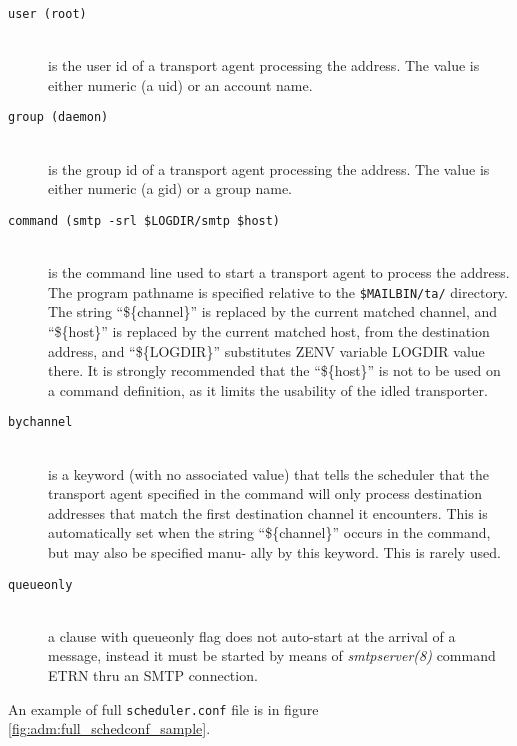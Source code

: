 \begin{description}
\item[\tt user \rm(root)]\mbox{}\\
is  the  user  id  of  a transport agent processing the
address.  The value is either numeric  (a  uid)  or  an
account name.

\item[\tt group \rm(daemon)]\mbox{}\\
is  the  group  id  of a transport agent processing the
address.  The value is either  numeric  (a  gid)  or a
group name.

\item[\tt command \rm(smtp -srl \$LOGDIR/smtp \$host)]\mbox{}\\
is  the command line used to start a transport agent to
process the address. The program pathname is specified
relative  to the  {\tt \$MAILBIN/ta/}  directory.   The  string
``\$\{channel\}'' is replaced by the current matched  channel,
and  ``\$\{host\}'' is  replaced by the current matched host,
from the destination address, and ``\$\{LOGDIR\}'' substitutes
ZENV variable LOGDIR value there.  It is strongly 
recommended that the ``\$\{host\}'' is not to be used on a command
definition, as it limits the usability of the idled transporter.

\item[\tt bychannel]\mbox{}\\
is a keyword (with no associated value) that tells  the
scheduler  that  the transport  agent specified in the
command will only process  destination  addresses  that
match  the  first  destination  channel  it encounters.
This is automatically set when  the  string  ``\$\{channel\}''
occurs  in the command, but may also be specified manu-
ally by this keyword.  This is rarely used.

\item[\tt queueonly]\mbox{}\\
a clause with queueonly flag does not auto-start at the
arrival  of  a  message,  instead it must be started by
means of {\em smtpserver(8)} command ETRN thru an  SMTP  connection.

\end{description}

An example of full {\tt scheduler.conf} file is in
figure \vref{fig:adm:full_schedconf_sample}.

